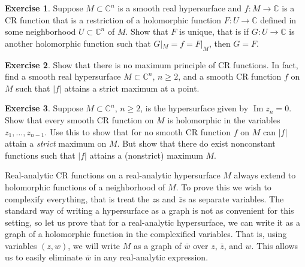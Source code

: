 \documentclass[12pt,openany]{book}
\renewcommand{\Im}{\operatorname{Im}}
\newcommand{\sabs}[1]{\lvert {#1} \rvert}
\newcommand{\C}{{\mathbb{C}}}
\theoremstyle{plain}
\theoremstyle{remark}
\theoremstyle{definition}
\newenvironment{exbox}{%
    \def\FrameCommand{\vrule width 1pt \relax\hspace{10pt}}%
    \MakeFramed{\advance\hsize-\width\FrameRestore}%
}{%
    \endMakeFramed
}
\theoremstyle{exercise}
\newtheorem{exercise}{Exercise}[section]
\theoremstyle{example}
\begin{document}
\begin{exbox}
\begin{exercise}
Suppose $M \subset \C^n$ is a smooth real hypersurface
and $f \colon M \to \C$ is a CR function that is a restriction
of a holomorphic function $F \colon U \to \C$ defined in
some neighborhood $U \subset \C^n$ of $M$.  Show that $F$ is unique,
that is if $G \colon U \to \C$ is another holomorphic function such that
$G|_M = f = F|_M$, then $G=F$.
\end{exercise}

\begin{exercise}
Show that there is no maximum principle of CR functions.  In fact, find a
smooth real hypersurface $M \subset \C^n$, $n \geq 2$, and a smooth CR function
$f$ on $M$ such that $\sabs{f}$ attains a strict maximum at a point.
\end{exercise}

\begin{exercise}
Suppose $M \subset \C^n$, $n \geq 2$, is the hypersurface given by $\Im z_n
= 0$.  Show that every smooth CR function on $M$ is holomorphic in the variables
$z_1,\ldots,z_{n-1}$.  Use this to show that for no smooth CR function $f$ on $M$ can
$\sabs{f}$ attain a \emph{strict} maximum on $M$.  But show that there do
exist nonconstant functions such that $\sabs{f}$ attains a (nonstrict) maximum $M$.
\end{exercise}
\end{exbox}

Real-analytic CR functions on a real-analytic
hypersurface $M$ always extend to holomorphic functions of a neighborhood of $M$.
To prove this we wish to complexify everything, that is treat the
$z$s and $\bar{z}$s as separate variables.  The standard way of
writing a hypersurface as a graph is not as convenient for this setting, so
let us prove that for a real-analytic hypersurface, we can write it as a
graph of a holomorphic function in the complexified variables.  That is,
using variables $(z,w)$,
we will write $M$ as a graph of $\bar{w}$ over $z$, $\bar{z}$, and $w$.
This allows us to easily eliminate $\bar{w}$ in any real-analytic
expression.
\end{document}
